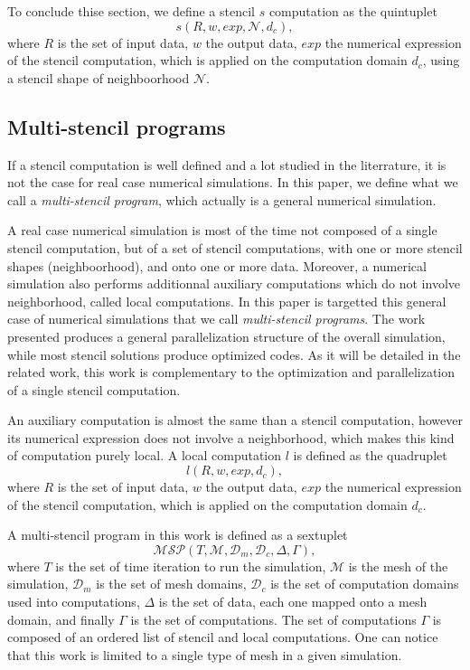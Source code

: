 To conclude thise section, we define a stencil $s$ computation as the quintuplet
\begin{equation} 
s(R,w,exp,\mathcal{N},d_c),
\label{eq:st}
\end{equation}
where $R$ is the set of input data, $w$ the output data, $exp$ the numerical expression of the stencil computation, which is applied on the computation domain $d_c$, using a stencil shape of neighboorhood $\mathcal{N}$.

\subsection{Multi-stencil programs}
\label{sect:multistencil}
If a stencil computation is well defined and a lot studied in the literrature, it is not the case for real case numerical simulations. In this paper, we define what we call a \emph{multi-stencil program}, which actually is a general numerical simulation. 

A real case numerical simulation is most of the time not composed of a single stencil computation, but of a set of stencil computations, with one or more stencil shapes (neighboorhood), and onto one or more data. Moreover, a numerical simulation also performs additionnal auxiliary computations which do not involve neighborhood, called local computations. In this paper is targetted this general case of numerical simulations that we call \emph{multi-stencil programs}. The work presented produces a general parallelization structure of the overall simulation, while most stencil solutions produce optimized codes. As it will be detailed in the related work, this work is complementary to the optimization and parallelization of a single stencil computation.

An auxiliary computation is almost the same than a stencil computation, however its numerical expression does not involve a neighborhood, which makes this kind of computation purely local. A local computation $l$ is defined as the quadruplet
\begin{equation} 
l(R,w,exp,d_c),
\label{eq:loc}
\end{equation}
where $R$ is the set of input data, $w$ the output data, $exp$ the numerical expression of the stencil computation, which is applied on the computation domain $d_c$.

A multi-stencil program in this work is defined as a sextuplet
\begin{equation} 
\mathcal{MSP}(T,\mathcal{M},\mathcal{D}_m,\mathcal{D}_c,\Delta,\Gamma),
\label{eq:msp}
\end{equation}
where $T$ is the set of time iteration to run the simulation, $\mathcal{M}$ is the mesh of the simulation, $\mathcal{D}_m$ is the set of mesh domains, $\mathcal{D}_c$ is the set of computation domains used into computations, $\Delta$ is the set of data, each one mapped onto a mesh domain, and finally $\Gamma$ is the set of computations. The set of computations $\Gamma$ is composed of an ordered list of stencil and local computations. One can notice that this work is limited to a single type of mesh in a given simulation.

